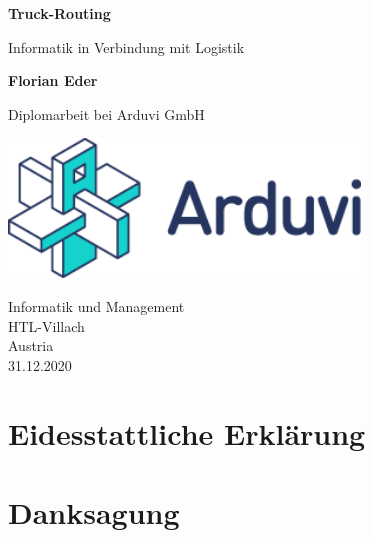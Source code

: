 \documentclass[12pt]{report}
\begin{document}
\begin{titlepage}
    \begin{center}
        \vspace*{1cm}
            
        \Huge
        \textbf{Truck-Routing}
            
        \vspace{0.5cm}
        \LARGE
        Informatik in Verbindung mit Logistik
            
        \vspace{1.5cm}
            
        \textbf{Florian Eder}
            
        \vspace{2.5cm}
            
        Diplomarbeit bei Arduvi GmbH
            
        \vspace{0.8cm}
            
        \includegraphics[width=0.7\textwidth]{ArduviLogoWithText.png}
        
        \vspace{0.8cm}

        \Large
        Informatik und Management\\
        HTL-Villach\\
        Austria\\
        31.12.2020
            
    \end{center}
\end{titlepage}

    \chapter*{Eidesstattliche Erklärung}
        

    \chapter*{Danksagung}
        
\end{document}
